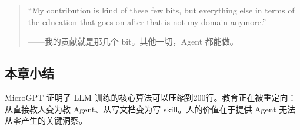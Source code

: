 \begin{quote}
``My contribution is kind of these few bits, but everything else in terms of the education that goes on after that is not my domain anymore.''

——我的贡献就是那几个 bit。其他一切，Agent 都能做。
\end{quote}

\subsection{本章小结}

MicroGPT 证明了 LLM 训练的核心算法可以压缩到200行。教育正在被重定向：从直接教人变为教 Agent、从写文档变为写 skill。人的价值在于提供 Agent 无法从零产生的关键洞察。


